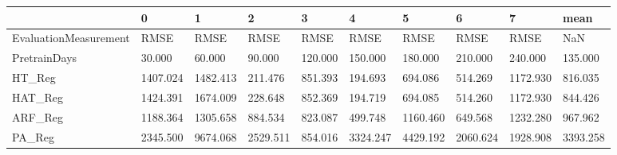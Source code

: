 \begin{tabular}{llllllllll}
\toprule
{} &        0 &        1 &        2 &       3 &        4 &        5 &        6 &        7 &     mean \\
\midrule
EvaluationMeasurement &     RMSE &     RMSE &     RMSE &    RMSE &     RMSE &     RMSE &     RMSE &     RMSE &      NaN \\
PretrainDays          &   30.000 &   60.000 &   90.000 & 120.000 &  150.000 &  180.000 &  210.000 &  240.000 &  135.000 \\
HT\_Reg                & 1407.024 & 1482.413 &  211.476 & 851.393 &  194.693 &  694.086 &  514.269 & 1172.930 &  816.035 \\
HAT\_Reg               & 1424.391 & 1674.009 &  228.648 & 852.369 &  194.719 &  694.085 &  514.260 & 1172.930 &  844.426 \\
ARF\_Reg               & 1188.364 & 1305.658 &  884.534 & 823.087 &  499.748 & 1160.460 &  649.568 & 1232.280 &  967.962 \\
PA\_Reg                & 2345.500 & 9674.068 & 2529.511 & 854.016 & 3324.247 & 4429.192 & 2060.624 & 1928.908 & 3393.258 \\
\bottomrule
\end{tabular}
